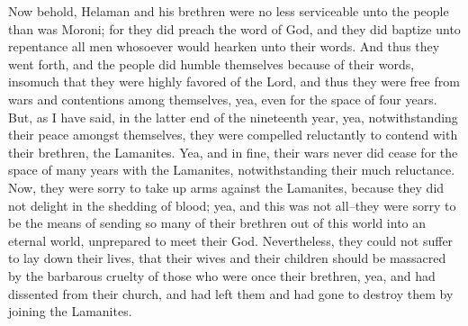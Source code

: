 Now behold, Helaman and his brethren were no less serviceable unto the people than was Moroni; for they did preach the word of God, and they did baptize unto repentance all men whosoever would hearken unto their words.
\bverse \iffalse And thus they went forth, and the people did humble themselves because of their words, insomuch that they were highly favored of the Lord, and thus they were free from wars and contentions among themselves, yea, even for the space of four years. \fi
And thus they went forth, and the people did humble themselves because of their words, insomuch that they were highly favored of the Lord, and thus they were free from wars and contentions among themselves, yea, even for the space of four years.
\bverse \iffalse But, as I have said, in the latter end of the nineteenth year, yea, notwithstanding their peace amongst themselves, they were compelled reluctantly to contend with their brethren, the Lamanites. \fi
But, as I have said, in the latter end of the nineteenth year, yea, notwithstanding their peace amongst themselves, they were compelled reluctantly to contend with their brethren, the Lamanites.
\bverse \iffalse Yea, and in fine, their wars never did cease for the space of many years with the Lamanites, notwithstanding their much reluctance. \fi
Yea, and in fine, their wars never did cease for the space of many years with the Lamanites, notwithstanding their much reluctance.
\bverse \iffalse Now, they were sorry to take up arms against the Lamanites, because they did not delight in the shedding of blood; yea, and this was not all--they were sorry to be the means of sending so many of their brethren out of this world into an eternal world, unprepared to meet their God. \fi
Now, they were sorry to take up arms against the Lamanites, because they did not delight in the shedding of blood; yea, and this was not all--they were sorry to be the means of sending so many of their brethren out of this world into an eternal world, unprepared to meet their God.
\bverse \iffalse Nevertheless, they could not suffer to lay down their lives, that their wives and their children should be massacred by the barbarous cruelty of those who were once their brethren, yea, and had dissented from their church, and had left them and had gone to destroy them by joining the Lamanites. \fi
Nevertheless, they could not suffer to lay down their lives, that their wives and their children should be massacred by the barbarous cruelty of those who were once their brethren, yea, and had dissented from their church, and had left them and had gone to destroy them by joining the Lamanites.
